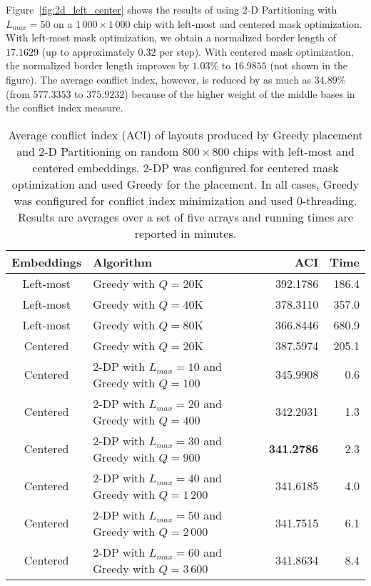 Figure~\ref{fig:2d_left_center} shows the results of using 2-D Partitioning with
$L_{max}=50$ on a $1\,000\times 1\,000$ chip with left-most and centered mask
optimization. With left-most mask optimization, we obtain a normalized border
length of $17.1629$ (up to approximately $0.32$ per step). With centered mask
optimization, the normalized border length improves by $1.03\%$ to $16.9855$
(not shown in the figure). The average conflict index, however, is reduced by as
much as $34.89\%$ (from $577.3353$ to $375.9232$) because of the higher weight
of the middle bases in the conflict index measure.

\begin{table}[t!]\centering
\caption{\label{tab:2dp_greedy}
  Average conflict index (ACI) of layouts produced by Greedy placement and 2-D
  Partitioning on random $800\times 800$ chips with left-most and centered
  embeddings. 2-DP was configured for centered mask optimization and used Greedy
  for the placement. In all cases, Greedy was configured for conflict index
  minimization and used $0$-threading. Results are averages over a set of five
  arrays and running times are reported in minutes.}
\footnotesize{
\begin{tabular}{clrr}
Embeddings & Algorithm & ACI & Time \\
\hline
Left-most  & Greedy with $Q=20$K & 392.1786 & 186.4 \\
Left-most  & Greedy with $Q=40$K & 378.3110 & 357.0 \\
Left-most  & Greedy with $Q=80$K & 366.8446 & 680.9 \\
\hline
Centered   & Greedy with $Q=20$K & 387.5974 & 205.1 \\
\hline
Centered   & 2-DP with $L_{max}=10$ and Greedy with $Q=100$    &      345.9908  & 0.6 \\
Centered   & 2-DP with $L_{max}=20$ and Greedy with $Q=400$    &      342.2031  & 1.3 \\
Centered   & 2-DP with $L_{max}=30$ and Greedy with $Q=900$    & {\bf 341.2786} & 2.3 \\
Centered   & 2-DP with $L_{max}=40$ and Greedy with $Q=1\,200$ &      341.6185  & 4.0 \\
Centered   & 2-DP with $L_{max}=50$ and Greedy with $Q=2\,000$ &      341.7515  & 6.1 \\
Centered   & 2-DP with $L_{max}=60$ and Greedy with $Q=3\,600$ &      341.8634  & 8.4 \\
\hline
\end{tabular}}
\end{table}

